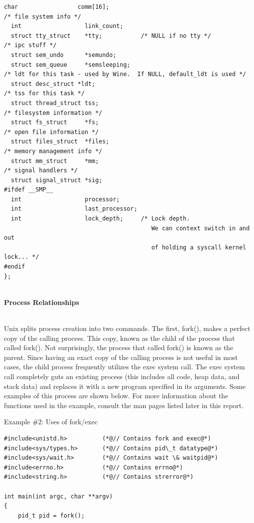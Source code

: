 \documentclass[12pt]{extarticle}
\newenvironment{myindentpar}[1]%
 {\begin{list}{}%
         {\setlength{\leftmargin}{#1}}%
         \item[]%
 }
 {\end{list}}
\begin{document}
\begin{myindentpar}{5mm}
\begin{lstlisting}[frame=single]
  char                 comm[16];
/* file system info */
  int                  link_count;
  struct tty_struct    *tty;           /* NULL if no tty */
/* ipc stuff */
  struct sem_undo      *semundo;
  struct sem_queue     *semsleeping;
/* ldt for this task - used by Wine.  If NULL, default_ldt is used */
  struct desc_struct *ldt;
/* tss for this task */
  struct thread_struct tss;
/* filesystem information */
  struct fs_struct     *fs;
/* open file information */
  struct files_struct  *files;
/* memory management info */
  struct mm_struct     *mm;
/* signal handlers */
  struct signal_struct *sig;
#ifdef __SMP__
  int                  processor;
  int                  last_processor;
  int                  lock_depth;     /* Lock depth. 
                                          We can context switch in and out
                                          of holding a syscall kernel lock... */  
#endif   
};
\end{lstlisting}

\newpage

    \ \\
    \textbf{Process Relationships}
    
    \ \\
    Unix splits process creation into two commands.  The first, fork(), makes a perfect copy of the calling process.  This copy, known as the child of the process that called fork().  Not surprisingly, the process that called fork() is known as the parent.  Since having an exact copy of the calling process is not useful in most cases, the child process frequently utilizes the exec system call.  The exec system call completely guts an existing process (this includes all code, heap data, and stack data) and replaces it with a new program specified in its arguments.  Some examples of this process are shown below.  For more information about the functions used in the example, consult the man pages listed later in this report.  
    
    \begin{center}
        Example \#2: Uses of fork/exec
    \end{center}
\begin{lstlisting}[frame=single]
#include<unistd.h>          (*@// Contains fork and exec@*)
#include<sys/types.h>       (*@// Contains pid\_t datatype@*)
#include<sys/wait.h>        (*@// Contains wait \& waitpid@*)
#include<errno.h>           (*@// Contains errno@*)
#include<string.h>          (*@// Contains strerror@*)

int main(int argc, char **argv)
{
    pid_t pid = fork();
    

\end{lstlisting}
\end{myindentpar}
\end{document}
